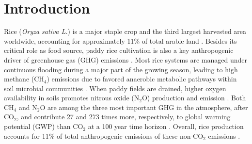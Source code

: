 



\section{Introduction}
\label{sec:intro}


Rice (\textit{Oryza sativa L.}) is a major staple crop and the third largest harvested area worldwide, accounting for approximately 11\% of total arable land \citep{Faostat2022}. Besides its critical role as food source, paddy rice cultivation is also a key anthropogenic driver of greenhouse gas (GHG) emissions \citep{bouman2007rice, nabuurs2022agriculture}. Most rice systems are managed under continuous flooding during a major part of the growing season, leading to high methane (CH$_{4}$) emissions due to favored anaerobic metabolic pathways within soil microbial communities \citep{conrad2007microbial, perry2024}. When paddy fields are drained, higher oxygen availability in soils promotes nitrous oxide (N$_{2}$O) production and emission \citep{cai1997methane}. Both CH$_{4}$ and N$_{2}$O are among the three most important GHG in the atmosphere, after CO$_{2}$, and contribute 27 and 273 times more, respectively, to global warming potential (GWP) than CO$_{2}$ at a 100 year time horizon \citep{IPCC2021}. Overall, rice production accounts for 11\% of total anthropogenic emissions of these non-CO$_{2}$ emissions \citep{Smith2007}.\\ 


